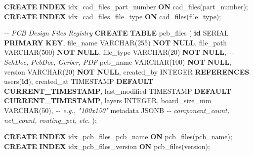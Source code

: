 \documentclass[
]{article}
\newenvironment{Shaded}{\begin{snugshade}}{\end{snugshade}}
\newcommand{\CommentTok}[1]{\textcolor[rgb]{0.56,0.35,0.01}{\textit{#1}}}
\newcommand{\DataTypeTok}[1]{\textcolor[rgb]{0.13,0.29,0.53}{#1}}
\newcommand{\DecValTok}[1]{\textcolor[rgb]{0.00,0.00,0.81}{#1}}
\newcommand{\FunctionTok}[1]{\textcolor[rgb]{0.13,0.29,0.53}{\textbf{#1}}}
\newcommand{\KeywordTok}[1]{\textcolor[rgb]{0.13,0.29,0.53}{\textbf{#1}}}
\newcommand{\NormalTok}[1]{#1}
\begin{document}
\begin{Shaded}
\begin{Highlighting}[]
\KeywordTok{CREATE} \KeywordTok{INDEX}\NormalTok{ idx\_cad\_files\_part\_number }\KeywordTok{ON}\NormalTok{ cad\_files(part\_number);}
\KeywordTok{CREATE} \KeywordTok{INDEX}\NormalTok{ idx\_cad\_files\_file\_type }\KeywordTok{ON}\NormalTok{ cad\_files(file\_type);}

\CommentTok{{-}{-} PCB Design Files Registry}
\KeywordTok{CREATE} \KeywordTok{TABLE}\NormalTok{ pcb\_files (}
    \KeywordTok{id}\NormalTok{ SERIAL }\KeywordTok{PRIMARY} \KeywordTok{KEY}\NormalTok{,}
\NormalTok{    file\_name }\DataTypeTok{VARCHAR}\NormalTok{(}\DecValTok{255}\NormalTok{) }\KeywordTok{NOT} \KeywordTok{NULL}\NormalTok{,}
\NormalTok{    file\_path }\DataTypeTok{VARCHAR}\NormalTok{(}\DecValTok{500}\NormalTok{) }\KeywordTok{NOT} \KeywordTok{NULL}\NormalTok{,}
\NormalTok{    file\_type }\DataTypeTok{VARCHAR}\NormalTok{(}\DecValTok{20}\NormalTok{) }\KeywordTok{NOT} \KeywordTok{NULL}\NormalTok{,  }\CommentTok{{-}{-} SchDoc, PcbDoc, Gerber, PDF}
\NormalTok{    pcb\_name }\DataTypeTok{VARCHAR}\NormalTok{(}\DecValTok{100}\NormalTok{) }\KeywordTok{NOT} \KeywordTok{NULL}\NormalTok{,}
\NormalTok{    version }\DataTypeTok{VARCHAR}\NormalTok{(}\DecValTok{20}\NormalTok{) }\KeywordTok{NOT} \KeywordTok{NULL}\NormalTok{,}
\NormalTok{    created\_by }\DataTypeTok{INTEGER} \KeywordTok{REFERENCES}\NormalTok{ users(}\KeywordTok{id}\NormalTok{),}
\NormalTok{    created\_at }\DataTypeTok{TIMESTAMP} \KeywordTok{DEFAULT} \FunctionTok{CURRENT\_TIMESTAMP}\NormalTok{,}
\NormalTok{    last\_modified }\DataTypeTok{TIMESTAMP} \KeywordTok{DEFAULT} \FunctionTok{CURRENT\_TIMESTAMP}\NormalTok{,}
\NormalTok{    layers }\DataTypeTok{INTEGER}\NormalTok{,}
\NormalTok{    board\_size\_mm }\DataTypeTok{VARCHAR}\NormalTok{(}\DecValTok{50}\NormalTok{),  }\CommentTok{{-}{-} e.g., "100x150"}
\NormalTok{    metadata JSONB  }\CommentTok{{-}{-} component\_count, net\_count, routing\_pct, etc.}
\NormalTok{);}

\KeywordTok{CREATE} \KeywordTok{INDEX}\NormalTok{ idx\_pcb\_files\_pcb\_name }\KeywordTok{ON}\NormalTok{ pcb\_files(pcb\_name);}
\KeywordTok{CREATE} \KeywordTok{INDEX}\NormalTok{ idx\_pcb\_files\_version }\KeywordTok{ON}\NormalTok{ pcb\_files(version);}


\end{Highlighting}
\end{Shaded}
\end{document}
